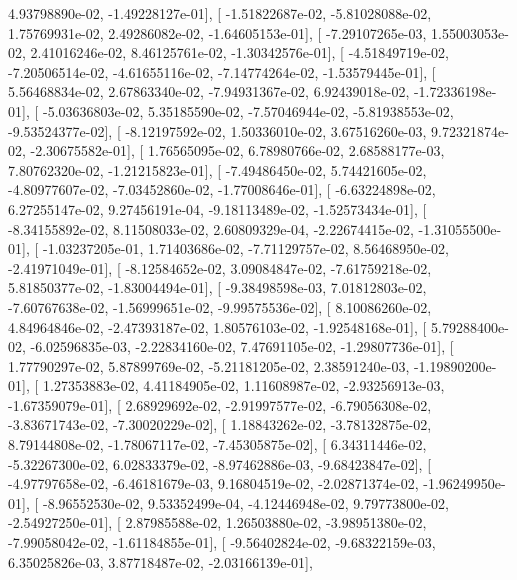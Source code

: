 \documentclass{article}
\begin{document}
          4.93798890e-02,  -1.49228127e-01],
       [ -1.51822687e-02,  -5.81028088e-02,   1.75769931e-02,
          2.49286082e-02,  -1.64605153e-01],
       [ -7.29107265e-03,   1.55003053e-02,   2.41016246e-02,
          8.46125761e-02,  -1.30342576e-01],
       [ -4.51849719e-02,  -7.20506514e-02,  -4.61655116e-02,
         -7.14774264e-02,  -1.53579445e-01],
       [  5.56468834e-02,   2.67863340e-02,  -7.94931367e-02,
          6.92439018e-02,  -1.72336198e-01],
       [ -5.03636803e-02,   5.35185590e-02,  -7.57046944e-02,
         -5.81938553e-02,  -9.53524377e-02],
       [ -8.12197592e-02,   1.50336010e-02,   3.67516260e-03,
          9.72321874e-02,  -2.30675582e-01],
       [  1.76565095e-02,   6.78980766e-02,   2.68588177e-03,
          7.80762320e-02,  -1.21215823e-01],
       [ -7.49486450e-02,   5.74421605e-02,  -4.80977607e-02,
         -7.03452860e-02,  -1.77008646e-01],
       [ -6.63224898e-02,   6.27255147e-02,   9.27456191e-04,
         -9.18113489e-02,  -1.52573434e-01],
       [ -8.34155892e-02,   8.11508033e-02,   2.60809329e-04,
         -2.22674415e-02,  -1.31055500e-01],
       [ -1.03237205e-01,   1.71403686e-02,  -7.71129757e-02,
          8.56468950e-02,  -2.41971049e-01],
       [ -8.12584652e-02,   3.09084847e-02,  -7.61759218e-02,
          5.81850377e-02,  -1.83004494e-01],
       [ -9.38498598e-03,   7.01812803e-02,  -7.60767638e-02,
         -1.56999651e-02,  -9.99575536e-02],
       [  8.10086260e-02,   4.84964846e-02,  -2.47393187e-02,
          1.80576103e-02,  -1.92548168e-01],
       [  5.79288400e-02,  -6.02596835e-03,  -2.22834160e-02,
          7.47691105e-02,  -1.29807736e-01],
       [  1.77790297e-02,   5.87899769e-02,  -5.21181205e-02,
          2.38591240e-03,  -1.19890200e-01],
       [  1.27353883e-02,   4.41184905e-02,   1.11608987e-02,
         -2.93256913e-03,  -1.67359079e-01],
       [  2.68929692e-02,  -2.91997577e-02,  -6.79056308e-02,
         -3.83671743e-02,  -7.30020229e-02],
       [  1.18843262e-02,  -3.78132875e-02,   8.79144808e-02,
         -1.78067117e-02,  -7.45305875e-02],
       [  6.34311446e-02,  -5.32267300e-02,   6.02833379e-02,
         -8.97462886e-03,  -9.68423847e-02],
       [ -4.97797658e-02,  -6.46181679e-03,   9.16804519e-02,
         -2.02871374e-02,  -1.96249950e-01],
       [ -8.96552530e-02,   9.53352499e-04,  -4.12446948e-02,
          9.79773800e-02,  -2.54927250e-01],
       [  2.87985588e-02,   1.26503880e-02,  -3.98951380e-02,
         -7.99058042e-02,  -1.61184855e-01],
       [ -9.56402824e-02,  -9.68322159e-03,   6.35025826e-03,
          3.87718487e-02,  -2.03166139e-01],
\end{document}
